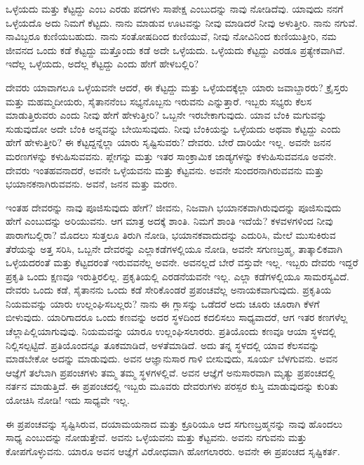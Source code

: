 ಒಳ್ಳೆಯದು ಮತ್ತು ಕೆಟ್ಟದ್ದು ಎಂಬ ಎರಡು ಪದಗಳು ಸಾಪೇಕ್ಷ ಎಂಬುದನ್ನು ನಾವು ನೋಡಿದೆವು. ಯಾವುದು ನನಗೆ ಒಳ್ಳೆಯದೊ ಅದು ನಿಮಗೆ ಕೆಟ್ಟದು. ನಾನು ಮಾಡುವ ಊಟವನ್ನು ನೀವು ಮಾಡಿದರೆ ನೀವು ಅಳುತ್ತೀರಿ. ನಾನು ನಗುವೆ. ನಾವಿಬ್ಬರೂ ಕುಣಿಯಬಹುದು. ನಾನು ಸಂತೋಷದಿಂದ ಕುಣಿಯುವೆ, ನೀವು ನೋವಿನಿಂದ ಕುಣಿಯುತ್ತೀರಿ, ನಮ ಜೀವನದ ಒಂದು ಕಡೆ ಕೆಟ್ಟದ್ದು ಮತ್ತೊಂದು ಕಡೆ ಅದೇ ಒಳ್ಳೆಯದು. ಒಳ್ಳೆಯದು ಕೆಟ್ಟದ್ದು ಎರಡೂ ಪ್ರತ್ಯೇಕವಾಗಿವೆ. ಇದೆಲ್ಲ ಒಳ್ಳೆಯದು, ಅದೆಲ್ಲ ಕೆಟ್ಟದ್ದು ಎಂದು ಹೇಗೆ ಹೇಳಬಲ್ಲಿರಿ?

ದೇವರು ಯಾವಾಗಲೂ ಒಳ್ಳೆಯವನೇ ಆದರೆ, ಈ ಕೆಟ್ಟದ್ದು ಮತ್ತು ಒಳ್ಳೆಯದಕ್ಕೆಲ್ಲಾ ಯಾರು ಜವಾಬ್ದಾರರು? ಕ್ರೈಸ್ತರು ಮತ್ತು ಮಹಮ್ಮದೀಯರು, ಸೈತಾನನೆಂಬ ಸಭ್ಯನೊಬ್ಬನು ಇರುವನು ಎನ್ನುತ್ತಾರೆ. ಇಬ್ಬರು ಸಭ್ಯರು ಕೆಲಸ ಮಾಡುತ್ತಿರುವರು ಎಂದು ನೀವು ಹೇಗೆ ಹೇಳುತ್ತೀರಿ? ಒಬ್ಬನೇ ಇರಬೇಕಾಗುವುದು. ಯಾವ ಬೆಂಕಿ ಮಗುವನ್ನು ಸುಡುವುದೋ ಅದೇ ಬೆಂಕಿ ಅನ್ನವನ್ನು ಬೇಯಿಸುವುದು. ನೀವು ಬೆಂಕಿಯನ್ನು ಒಳ್ಳೆಯದು ಅಥವಾ ಕೆಟ್ಟದ್ದು ಎಂದು ಹೇಗೆ ಹೇಳುತ್ತೀರಿ? ಈ ಕೆಟ್ಟದ್ದನ್ನೆಲ್ಲಾ ಯಾರು ಸೃಷ್ಟಿಸುವರು? ದೇವರು. ಬೇರೆ ದಾರಿಯೇ ಇಲ್ಲ. ಅವನೇ ಜನನ ಮರಣಗಳನ್ನು ಕಳುಹಿಸುವವನು. ಪ್ಲೇಗನ್ನು ಮತ್ತು ಇತರ ಸಾಂಕ್ರಾಮಿಕ ಜಾಡ್ಯಗಳನ್ನು ಕಳುಹಿಸುವವನೂ ಅವನೇ. ದೇವರು ಇಂತಹವನಾದರೆ, ಅವನೇ ಒಳ್ಳೆಯವನು ಮತ್ತು ಕೆಟ್ಟವನು. ಅವನೇ ಸುಂದರನಾಗಿರುವವನು ಮತ್ತು ಭಯಾನಕನಾಗಿರುವವನು. ಅವನೆ, ಜನನ ಮತ್ತು ಮರಣ.

ಇಂತಹ ದೇವರನ್ನು ನಾವು ಪೂಜಿಸುವುದು ಹೇಗೆ? ಜೀವನು, ನಿಜವಾಗಿ ಭಯಾನಕವಾಗಿರುವುದನ್ನು ಪೂಜಿಸುವುದು ಹೇಗೆ ಎಂಬುದನ್ನು ಅರಿಯುವನು. ಆಗ ಮಾತ್ರ ಅದಕ್ಕೆ ಶಾಂತಿ. ನಿಮಗೆ ಶಾಂತಿ ಇದೆಯೆ? ಕಳವಳಗಳಿಂದ ನೀವು ಪಾರಾಗಬಲ್ಲಿರಾ? ಮೊದಲು ಸುತ್ತಲೂ ತಿರುಗಿ ನೋಡಿ, ಭಯಾನಕವಾದುದನ್ನು ಎದುರಿಸಿ, ಮೇಲೆ ಮುಸುಕಿರುವ ತೆರೆಯನ್ನು ಅತ್ತ ಸರಿಸಿ, ಒಬ್ಬನೇ ದೇವರನ್ನು ಎಲ್ಲಾ\break ಕಡೆಗಳಲ್ಲಿಯೂ ನೋಡಿ, ಅವನೇ ಸಗುಣಬ್ರಹ್ಮ, ತಾತ್ಕಾಲಿಕವಾಗಿ ಒಳ್ಳೆಯದರಂತೆ ಮತ್ತು ಕೆಟ್ಟದರಂತೆ ಇರುವವನೆಲ್ಲ ಅವನೇ. ಅವನಲ್ಲದೆ ಬೇರೆ ವಸ್ತುವೇ ಇಲ್ಲ. ಇಬ್ಬರು ದೇವರು ಇದ್ದರೆ ಪ್ರಕೃತಿ ಒಂದು ಕ್ಷಣವೂ ಇರುತ್ತಿರಲಿಲ್ಲ. ಪ್ರಕೃತಿಯಲ್ಲಿ ಎರಡನೆಯವನೇ ಇಲ್ಲ. ಎಲ್ಲಾ ಕಡೆಗಳಲ್ಲಿಯೂ ಸಾಮರಸ್ಯವಿದೆ. ದೇವರು ಒಂದು ಕಡೆ, ಸೈತಾನನು ಒಂದು ಕಡೆ ಸೇರಿಕೊಂಡರೆ ಪ್ರಪಂಚವೆಲ್ಲ ಅನಾಯಕವಾಗುವುದು. ಪ್ರಕೃತಿಯ ನಿಯಮವನ್ನು ಯಾರು ಉಲ್ಲಂಘಿಸಬಲ್ಲರು? ನಾನು ಈ ಗ್ಲಾಸನ್ನು ಒಡೆದರೆ ಅದು ಚೂರು ಚೂರಾಗಿ ಕೆಳಗೆ ಬೀಳುವುದು. ಯಾರಿಗಾದರೂ ಒಂದು ಕಣವನ್ನು ಅದರ ಸ್ಥಳದಿಂದ ಕದಲಿಸಲು ಸಾಧ್ಯವಾದರೆ, ಆಗ ಇತರ ಕಣಗಳೆಲ್ಲ ಚೆಲ್ಲಾಪಿಲ್ಲಿಯಾಗುವುವು. ನಿಯಮವನ್ನು ಯಾರೂ ಉಲ್ಲಂಘಿಸಲಾರರು. ಪ್ರತಿಯೊಂದು ಕಣವೂ ಆಯಾ ಸ್ಥಳದಲ್ಲಿ ನಿಲ್ಲಿಸಲ್ಪಟ್ಟಿದೆ. ಪ್ರತಿಯೊಂದನ್ನೂ ತೂಕಮಾಡಿದೆ, ಅಳತೆಮಾಡಿದೆ. ಅದು ತನ್ನ ಸ್ಥಳದಲ್ಲಿ ಯಾವ ಕೆಲಸವನ್ನು ಮಾಡಬೇಕೋ ಅದನ್ನು ಮಾಡುವುದು. ಅವನ ಆಜ್ಞಾನುಸಾರ ಗಾಳಿ ಬೀಸುವುದು, ಸೂರ್ಯ ಬೆಳಗುವನು. ಅವನ ಆಜ್ಞೆಗೆ ತಲೆಬಾಗಿ ಪ್ರಪಂಚಗಳು ತಮ್ಮ ತಮ್ಮ ಸ್ಥಳಗಳಲ್ಲಿವೆ. ಅವನ ಆಜ್ಞೆಗೆ ಅನುಸಾರವಾಗಿ ಮೃತ್ಯು ಪ್ರಪಂಚದಲ್ಲಿ ನರ್ತನ ಮಾಡುತ್ತಿದೆ. ಈ ಪ್ರಪಂಚದಲ್ಲಿ ಇಬ್ಬರು ಮೂವರು ದೇವರುಗಳು ಪರಸ್ಪರ ಕುಸ್ತಿ ಮಾಡುವುದನ್ನು ಕುರಿತು ಯೋಚಿಸಿ ನೋಡಿ! ಇದು ಸಾಧ್ಯವೇ ಇಲ್ಲ.

ಈ ಪ್ರಪಂಚವನ್ನು ಸೃಷ್ಟಿಸಿರುವ, ದಯಾಮಯನಾದ ಮತ್ತು ಕ್ರೂರಿಯೂ ಆದ ಸಗುಣಬ್ರಹ್ಮನನ್ನು ನಾವು ಹೊಂದಲು ಸಾಧ್ಯ ಎಂಬುದನ್ನು ನೋಡುತ್ತೇವೆ. ಅವನು ಒಳ್ಳೆಯವನು ಮತ್ತು ಕೆಟ್ಟವನು. ಅವನು ನಗುವನು ಮತ್ತು ಕೋಪಗೊಳ್ಳುವನು. ಯಾರೂ ಅವನ ಆಜ್ಞೆಗೆ ವಿರೋಧವಾಗಿ ಹೋಗಲಾರರು. ಅವನೇ ಈ ಪ್ರಪಂಚದ ಸೃಷ್ಟಿಕರ್ತ.


